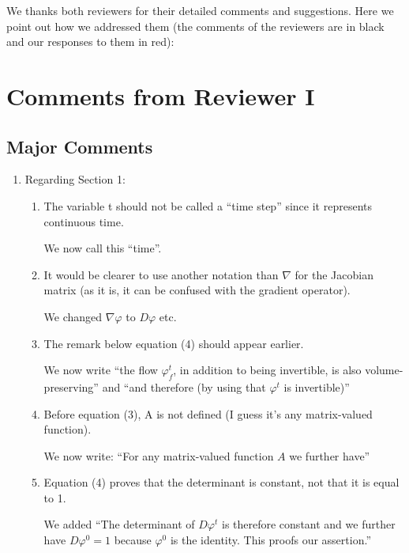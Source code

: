 \documentclass{article}
\begin{document}
We thanks both reviewers for their detailed comments and suggestions. Here we point out how we addressed them (the comments of the reviewers are in black and our responses to them in {\color{mred} red}):

\section{Comments from Reviewer I}

\subsection*{Major Comments}
\begin{enumerate}
\item Regarding Section 1:
\begin{enumerate}[label=\arabic*.]
\item The variable t should not be called a ``time step'' since it represents continuous time.

    {\color{mred}We now call this ``time''}.

\item It would be clearer to use another notation than $\nabla$ for the Jacobian matrix (as it is, it can be confused with the gradient operator).

    {\color{mred}We changed $\nabla\varphi$ to $D\varphi$ etc.}

\item The remark below equation (4) should appear earlier.

    {\color{mred}We now write ``the flow $\varphi_f^t$, in addition to being invertible, is also volume-preserving'' and ``and therefore (by using that $\varphi^t$ is invertible)''}

\item Before equation (3), A is not defined (I guess it's any matrix-valued function).

    {\color{mred} We now write: ``For any matrix-valued function $A$ we further have''}

\item Equation (4) proves that the determinant is constant, not that it is equal to 1.

    {\color{mred} We added ``The determinant of $D\varphi^t$ is therefore constant and we further have $D\varphi^0 = 1$ because $\varphi^0$ is the identity. This proofs our assertion.''}

\end{enumerate}


\end{enumerate}
\end{document}
